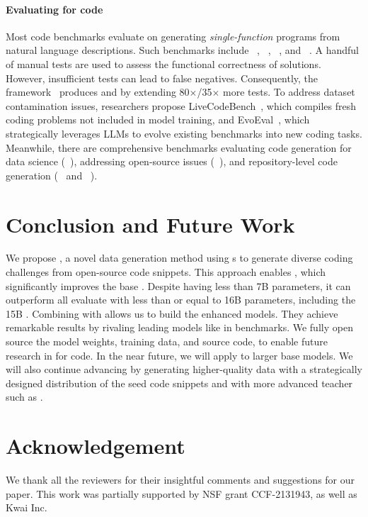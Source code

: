 \paragraph{Evaluating  for code}

Most code benchmarks evaluate  on generating \emph{single-function} programs from natural language descriptions.
Such benchmarks include \humaneval{}~\cite{codex}, \mbpp{}~\cite{synthesisllm}, \apps{}~\cite{apps}, and \codecontests~\cite{codecontests}.
A handful of manual tests are used to assess the functional correctness of  solutions.
However, insufficient tests can lead to false negatives. Consequently, the \evalplus{} framework~\cite{liu2023code} produces \humaneval{+} and \mbpp{+} by extending 80$\times$/35$\times$ more tests.
To address dataset contamination issues, researchers propose LiveCodeBench~\cite{lcb}, which compiles fresh coding problems not included in model training, and EvoEval~\cite{evoeval}, which strategically leverages LLMs to evolve existing benchmarks into new coding tasks.
Meanwhile, there are comprehensive benchmarks evaluating code generation for data science (\dsonek~\cite{ds1000}), addressing open-source issues (\swebench~\cite{swebench}), and repository-level code generation (\crosscodeeval{}~\cite{cceval} and \repoeval{}~\cite{repocoder}).

\section{Conclusion and Future Work}
We propose \tech, a novel data generation method using \llmfull{}s to generate diverse coding challenges from open-source code snippets.
This approach enables \model{}, which significantly improves the base \llm. Despite having less than 7B parameters, it
can outperform all evaluate
 with less than or equal to 16B parameters, including the 15B \wizardcoder{}.
Combining \tech{} with \evolinstruct{} allows us to build the enhanced \modelx{} models.
They achieve remarkable results by rivaling leading models like \chatgpt{} in \humaneval{} benchmarks.
We fully open source the model weights, training data, and source code, to enable future research in  for code.
In the near future, we will apply \tech{} to larger base models. We will also continue advancing \tech{} by generating higher-quality data with a strategically designed distribution of the seed code snippets and with more advanced teacher  such as \gptfour. 

\section*{Acknowledgement}
We thank all the reviewers for their insightful comments and suggestions for our paper. This work was partially supported by NSF grant CCF-2131943, as well as Kwai Inc.

